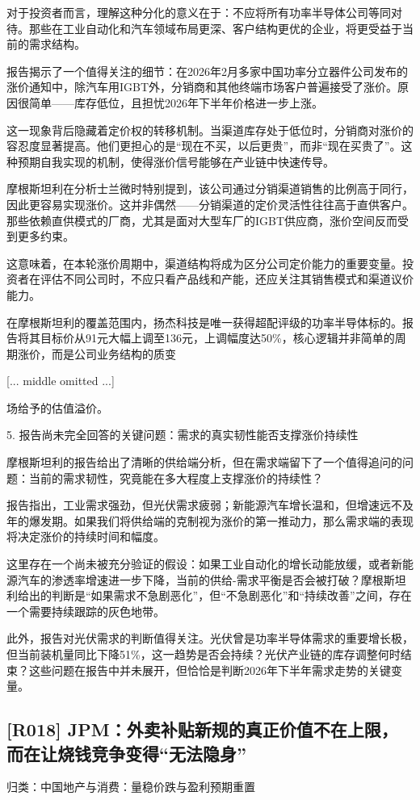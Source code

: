 \documentclass[11pt]{ctexart}
\begin{document}
对于投资者而言，理解这种分化的意义在于：不应将所有功率半导体公司等同对待。那些在工业自动化和汽车领域布局更深、客户结构更优的企业，将更受益于当前的需求结构。

报告揭示了一个值得关注的细节：在2026年2月多家中国功率分立器件公司发布的涨价通知中，除汽车用IGBT外，分销商和其他终端市场客户普遍接受了涨价。原因很简单——库存低位，且担忧2026年下半年价格进一步上涨。

这一现象背后隐藏着定价权的转移机制。当渠道库存处于低位时，分销商对涨价的容忍度显著提高。他们更担心的是“现在不买，以后更贵”，而非“现在买贵了”。这种预期自我实现的机制，使得涨价信号能够在产业链中快速传导。

摩根斯坦利在分析士兰微时特别提到，该公司通过分销渠道销售的比例高于同行，因此更容易实现涨价。这并非偶然——分销渠道的定价灵活性往往高于直供客户。那些依赖直供模式的厂商，尤其是面对大型车厂的IGBT供应商，涨价空间反而受到更多约束。

这意味着，在本轮涨价周期中，渠道结构将成为区分公司定价能力的重要变量。投资者在评估不同公司时，不应只看产品线和产能，还应关注其销售模式和渠道议价能力。

在摩根斯坦利的覆盖范围内，扬杰科技是唯一获得超配评级的功率半导体标的。报告将其目标价从91元大幅上调至136元，上调幅度达50\%，核心逻辑并非简单的周期涨价，而是公司业务结构的质变

[... middle omitted ...]

场给予的估值溢价。

5. 报告尚未完全回答的关键问题：需求的真实韧性能否支撑涨价持续性

摩根斯坦利的报告给出了清晰的供给端分析，但在需求端留下了一个值得追问的问题：当前的需求韧性，究竟能在多大程度上支撑涨价的持续性？

报告指出，工业需求强劲，但光伏需求疲弱；新能源汽车增长温和，但增速远不及 年的爆发期。如果我们将供给端的克制视为涨价的第一推动力，那么需求端的表现将决定涨价的持续时间和幅度。

这里存在一个尚未被充分验证的假设：如果工业自动化的增长动能放缓，或者新能源汽车的渗透率增速进一步下降，当前的供给-需求平衡是否会被打破？摩根斯坦利给出的判断是“如果需求不急剧恶化”，但“不急剧恶化”和“持续改善”之间，存在一个需要持续跟踪的灰色地带。

此外，报告对光伏需求的判断值得关注。光伏曾是功率半导体需求的重要增长极，但当前装机量同比下降51\%，这一趋势是否会持续？光伏产业链的库存调整何时结束？这些问题在报告中并未展开，但恰恰是判断2026年下半年需求走势的关键变量。

\subsection{[R018] JPM：外卖补贴新规的真正价值不在上限，而在让烧钱竞争变得“无法隐身”}
{\small\color{refgray}归类：中国地产与消费：量稳价跌与盈利预期重置}
\end{document}
